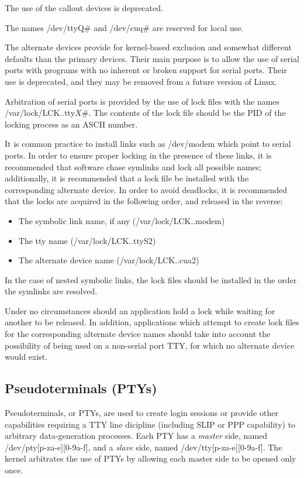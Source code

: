The use of the callout devices is deprecated.

The names {\file /dev/ttyQ$\#$} and {\file /dev/cuq$\#$} are reserved
for local use.

The alternate devices provide for kernel-based exclusion and somewhat
different defaults than the primary devices.  Their main purpose is to
allow the use of serial ports with programs with no inherent or broken
support for serial ports.  Their use is deprecated, and they may be
removed from a future version of Linux.

Arbitration of serial ports is provided by the use of lock files with
the names {\file /var/lock/LCK..tty${X\#}$}.  The contents of the lock
file should be the PID of the locking process as an ASCII number.

It is common practice to install links such as {\file /dev/modem\/}
which point to serial ports.  In order to ensure proper locking in the
presence of these links, it is recommended that software chase
symlinks and lock all possible names; additionally, it is recommended
that a lock file be installed with the corresponding alternate
device.  In order to avoid deadlocks, it is recommended that the locks
are acquired in the following order, and released in the reverse:
\begin{itemize}
\item{The symbolic link name, if any ({\file /var/lock/LCK..modem})}
\item{The {\file tty} name ({\file /var/lock/LCK..ttyS2})}
\item{The alternate device name ({\file /var/lock/LCK..cua2})}
\end{itemize}
In the case of nested symbolic links, the lock files should be
installed in the order the symlinks are resolved.

Under no circumstances should an application hold a lock while waiting
for another to be released.  In addition, applications which attempt
to create lock files for the corresponding alternate device names
should take into account the possibility of being used on a non-serial
port TTY, for which no alternate device would exist.

\subsection{Pseudoterminals (PTYs)}

Pseudoterminals, or PTYs, are used to create login sessions or provide
other capabilities requiring a TTY line dicipline (including SLIP or
PPP capability) to arbitrary data-generation processes.  Each PTY has
a {\em master\/} side, named {\file /dev/pty[p-za-e][0-9a-f]\/}, and a
{\em slave\/} side, named {\file /dev/tty[p-za-e][0-9a-f]\/}.  The
kernel arbitrates the use of PTYs by allowing each master side to be
opened only once.

